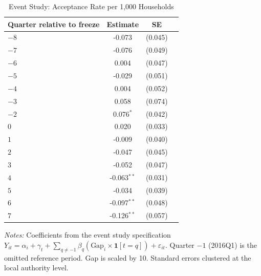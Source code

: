 \begin{table}[t]
\centering
\caption{Event Study: Acceptance Rate per 1,000 Households}
\label{tab:eventstudy}
\begin{tabular}{lccc}
\hline\hline
Quarter relative to freeze & Estimate & SE & \\
\hline
$-8$ & -0.073 & (0.045) & \\
$-7$ & -0.076 & (0.049) & \\
$-6$ & 0.004 & (0.047) & \\
$-5$ & -0.029 & (0.051) & \\
$-4$ & 0.004 & (0.052) & \\
$-3$ & 0.058 & (0.074) & \\
$-2$ & 0.076$^{*}$ & (0.042) & \\
$0$ & 0.020 & (0.033) & \\
$1$ & -0.009 & (0.040) & \\
$2$ & -0.047 & (0.045) & \\
$3$ & -0.052 & (0.047) & \\
$4$ & -0.063$^{**}$ & (0.031) & \\
$5$ & -0.034 & (0.039) & \\
$6$ & -0.097$^{**}$ & (0.048) & \\
$7$ & -0.126$^{**}$ & (0.057) & \\
\hline\hline
\end{tabular}
\begin{tablenotes}
\small
\item \textit{Notes:} Coefficients from the event study specification $Y_{it} = \alpha_i + \gamma_t + \sum_{q \neq -1} \beta_q (\text{Gap}_i \times \mathbf{1}[t = q]) + \varepsilon_{it}$. Quarter $-1$ (2016Q1) is the omitted reference period. Gap is scaled by 10. Standard errors clustered at the local authority level.
\end{tablenotes}
\end{table}
